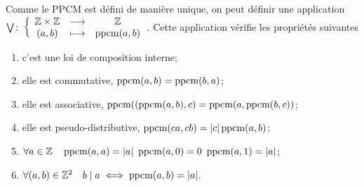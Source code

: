 \begin{prop}
  Comme le PPCM est défini de manière unique, on peut définir une application 
  \(\bigvee\colon \left\{\begin{array}{ccc} \mathbb{Z}\times\mathbb{Z} & \longrightarrow &\mathbb{Z}\\ (a,b) & \longmapsto & \operatorname{ppcm}(a,b) \end{array} \right.\). Cette application 
  vérifie les propriétés suivantes
  \begin{enumerate}
    \item c'est une loi de composition interne;
    \item elle est commutative, \(\operatorname{ppcm}(a,b)=\operatorname{ppcm}(b,a)\);
    \item elle est associative, \(\operatorname{ppcm}((\operatorname{ppcm}(a,b),c)=\operatorname{ppcm}(a,\operatorname{ppcm}(b,c))\);
    \item elle est pseudo-distributive, \(\operatorname{ppcm}(ca,cb)=\left\lvert c\right\rvert\operatorname{ppcm}(a,b)\);
    \item \(\forall a \in \Z \quad \ppcm(a,a)=\abs{a} \ \ppcm(a,0) = 0 \ 
      \ppcm(a,1)=\abs{a}\);
    \item \(\forall (a,b) \in \mathbb{Z}^2 \quad b\mid a \iff \operatorname{ppcm}(a,b)=\left\lvert a\right\rvert\).
  \end{enumerate}
\end{prop}

